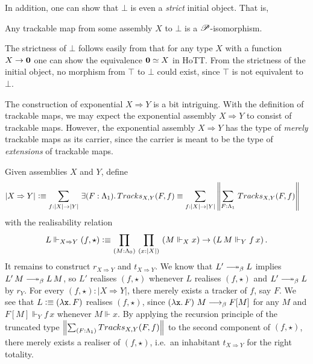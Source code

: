 \documentclass[a4paper,UKenglish,numberwithinsect,cleveref,thm-restate]{lipics-v2021}
\numberwithin{equation}{section}
\theoremstyle{plain}
\begin{document}
In addition, one can show that $\bot$ is even a \emph{strict} initial object. That is, 
\begin{proposition}\label{prop:strict-initial}
  Any trackable map from some assembly $X$ to $\bot$ is a $\mathscr{P}$-isomorphism. 
\end{proposition}
The strictness of $\bot$ follows easily from that for any type $X$ with a function $X \to \mathbf{0}$ one can show the equivalence $\mathbf{0} \simeq X$ in HoTT.
From the strictness of the initial object, no morphism from $\top$ to $\bot$ could exist, since $\top$ is not equivalent to $\bot$.

The construction of exponential $X \Rightarrow Y$ is a bit intriguing.
With the definition of trackable maps, we may expect the exponential assembly $X \Rightarrow Y$ to consist of trackable maps.
However, the exponential assembly $X \Rightarrow Y$ has the type of \emph{merely} trackable maps as its carrier, since the carrier is meant to be the type of \emph{extensions} of trackable maps.
\begin{example}[Exponential]
  Given assemblies $X$ and $Y$, define
  \begin{align*}
    \bproj{X \Rightarrow Y} & \defeq \sm{f : |X| \to |Y|} \exis{F : \Lambda_1} \mathsf{Tracks}_{X, Y}(F, f) \equiv \sm{f : |X| \to |Y|} \brck{\sm{F : \Lambda_1} \mathsf{Tracks}_{X, Y}(F, f) }
  \end{align*}
  with the realisability relation 
  \[
    L \Vdash_{X \Rightarrow Y} (f, \star) \defeq \prd{M : \Lambda_0}{x : |X|} \left( M \Vdash_X x\right) \to \left(L\,M \Vdash_Y f\,x\right).
  \]
  It remains to construct $r_{X\Rightarrow Y}$ and $t_{X \Rightarrow Y}$. 
  We know that $L' \reduce L$ implies $L'\,M \reduce L\,M$, so $L'$ realises $(f, \star)$ whenever $L$ realises $(f, \star)$ and $L' \reduce L$ by $r_Y$.
  For every $(f, \star) : |X \Rightarrow Y|$, there merely exists a tracker of $f$, say $F$.
  We see that $L \vcentcolon\equiv \left(\mathtt{\lambda x}.\,F\right)$ realises $(f, \star)$, since
  $\left(\mathtt{\lambda x}.\,F\right)\,M \longrightarrow_{\beta} F[M]$ for any $M$ and $F[M] \Vdash_Y f\,x$ whenever $M \Vdash x$.
  By applying the recursion principle of the truncated type $\brck{\sm{F : \Lambda_1} \mathsf{Tracks}_{X, Y}(F, f) }$ to the second component of $(f, \star)$, there merely exists a realiser of $(f, \star)$, i.e.\ an inhabitant $t_{X \Rightarrow Y}$ for the right totality.

\end{example}
\end{document}
